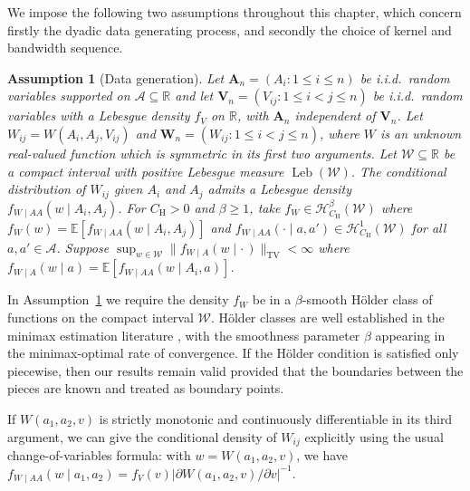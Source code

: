 \documentclass[11pt,lof]{puthesis}
\newcommand{\R}{\ensuremath{\mathbb{R}}}
\newcommand{\E}{\ensuremath{\mathbb{E}}}
\newcommand{\rH}{\ensuremath{\mathrm{H}}}
\newcommand{\TV}{\mathrm{TV}}
\newcommand{\bW}{\ensuremath{\mathbf{W}}}
\newcommand{\bA}{\ensuremath{\mathbf{A}}}
\newcommand{\bV}{\ensuremath{\mathbf{V}}}
\newcommand{\cH}{\ensuremath{\mathcal{H}}}
\newcommand{\cW}{\ensuremath{\mathcal{W}}}
\newcommand{\cA}{\ensuremath{\mathcal{A}}}
\DeclareMathOperator{\Leb}{Leb}
\theoremstyle{break}
\newtheorem{assumption}{Assumption}[section]
\theoremstyle{proof}
\begin{document}
We impose the following two assumptions throughout this chapter,
which concern firstly the dyadic data generating process, and
secondly the choice of kernel and bandwidth sequence.

%
\begin{assumption}[Data generation]
  \label{ass:kernel_data}
  Let $\bA_n = (A_i: 1 \leq i \leq n)$ be i.i.d.\ random variables supported on
  $\cA \subseteq \R$ and let $\bV_n = (V_{i j}: 1 \leq i < j \leq n)$ be
  i.i.d.\ random variables with a Lebesgue density $f_V$ on $\R$, with $\bA_n$
  independent of $\bV_n$.
  Let $W_{i j} = W(A_i, A_j, V_{i j})$ and
  $\bW_n = (W_{i j}: 1 \leq i < j \leq n)$, where $W$ is an unknown real-valued
  function which is symmetric in its first two arguments.
  Let $\cW \subseteq \R$ be a compact interval with positive Lebesgue measure
  $\Leb(\cW)$. The conditional distribution of $W_{i j}$ given $A_i$ and $A_j$
  admits a Lebesgue density $f_{W \mid AA}(w \mid A_i, A_j)$.
  For $C_\rH > 0$ and $\beta \geq 1$, take $f_W \in \cH^\beta_{C_\rH}(\cW)$
  where $f_{W}(w) = \E\left[f_{W \mid AA}(w \mid A_i,A_j)\right]$ and
  $f_{W \mid AA}(\cdot \mid a, a') \in \cH^1_{C_\rH}(\cW)$
  for all $a,a' \in \cA$. Suppose
  $\sup_{w \in \cW} \|f_{W \mid A}(w \mid \cdot\,)\|_\TV <\infty$ where
  $f_{W \mid A}(w \mid a) = \E\left[f_{W \mid AA}(w \mid A_i,a)\right]$.
\end{assumption}

In Assumption~\ref{ass:kernel_data} we require the density $f_W$ be in a
$\beta$-smooth H\"older class of functions on the compact interval $\cW$.
H\"older classes are well established in the minimax estimation literature
\citep{stone1982optimal,gine2021mathematical},
with the smoothness parameter $\beta$ appearing
in the minimax-optimal rate of convergence. If the H\"older condition is
satisfied only piecewise, then our results remain valid provided that the
boundaries between the pieces are known and treated as boundary points.

If $W(a_1, a_2, v)$ is strictly monotonic and continuously differentiable in
its third argument, we can give the conditional density of $W_{i j}$ explicitly
using the usual change-of-variables formula: with $w=W(a_1,a_2,v)$, we have
$f_{W \mid AA}(w \mid a_1,a_2)
= f_V(v) \big|\partial W(a_1,a_2,v)/\partial v\big|^{-1}$.
\end{document}
